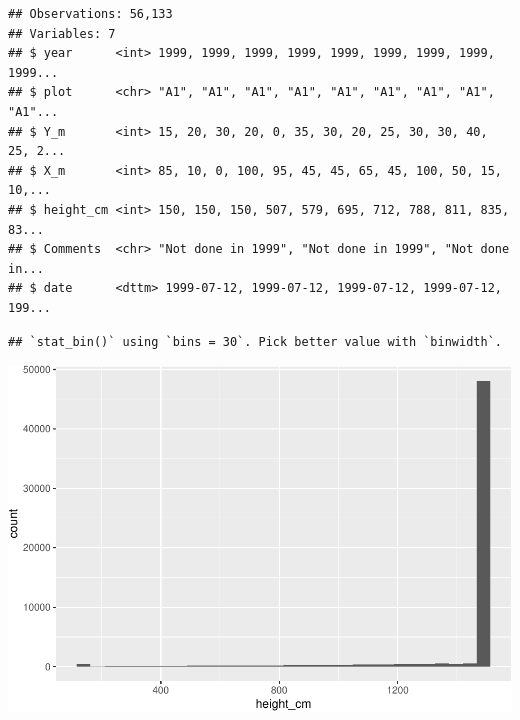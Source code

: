 \documentclass[]{article}
\newenvironment{Shaded}{\begin{snugshade}}{\end{snugshade}}
\newcommand{\CommentTok}[1]{\textcolor[rgb]{0.56,0.35,0.01}{\textit{#1}}}
\newcommand{\DataTypeTok}[1]{\textcolor[rgb]{0.13,0.29,0.53}{#1}}
\newcommand{\DecValTok}[1]{\textcolor[rgb]{0.00,0.00,0.81}{#1}}
\newcommand{\FloatTok}[1]{\textcolor[rgb]{0.00,0.00,0.81}{#1}}
\newcommand{\KeywordTok}[1]{\textcolor[rgb]{0.13,0.29,0.53}{\textbf{#1}}}
\newcommand{\NormalTok}[1]{#1}
\newcommand{\OperatorTok}[1]{\textcolor[rgb]{0.81,0.36,0.00}{\textbf{#1}}}
\newcommand{\StringTok}[1]{\textcolor[rgb]{0.31,0.60,0.02}{#1}}
\begin{document}
\begin{verbatim}
## Observations: 56,133
## Variables: 7
## $ year      <int> 1999, 1999, 1999, 1999, 1999, 1999, 1999, 1999, 1999...
## $ plot      <chr> "A1", "A1", "A1", "A1", "A1", "A1", "A1", "A1", "A1"...
## $ Y_m       <int> 15, 20, 30, 20, 0, 35, 30, 20, 25, 30, 30, 40, 25, 2...
## $ X_m       <int> 85, 10, 0, 100, 95, 45, 45, 65, 45, 100, 50, 15, 10,...
## $ height_cm <int> 150, 150, 150, 507, 579, 695, 712, 788, 811, 835, 83...
## $ Comments  <chr> "Not done in 1999", "Not done in 1999", "Not done in...
## $ date      <dttm> 1999-07-12, 1999-07-12, 1999-07-12, 1999-07-12, 199...
\end{verbatim}

\begin{Shaded}
\end{Shaded}

\begin{verbatim}
## `stat_bin()` using `bins = 30`. Pick better value with `binwidth`.
\end{verbatim}

\includegraphics{R_tidyverse_for_geographers_files/figure-latex/unnamed-chunk-24-3.pdf}

\begin{Shaded}
\end{Shaded}
\end{document}

